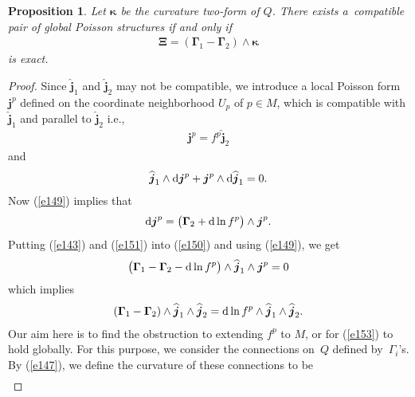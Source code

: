 \documentclass[10pt,a4paper]{amsart}
\numberwithin{equation}{section}
\newtheorem{Proposition}[Theorem]{Proposition}
 { \theoremstyle{definition}
\newtheorem{Definition}[Theorem]{Definition} }
\begin{document}
\begin{Proposition}\label{proposition6}
Let $\boldsymbol{\kappa }$ be the curvature two-form of $Q$. There exists a~compatible pair of global Poisson structures if and only if
\begin{gather*}
\boldsymbol{\Xi }= ( \boldsymbol{\Gamma }_{1}-\boldsymbol{\Gamma }_{2} ) \wedge \boldsymbol{\kappa } \label{e148}
\end{gather*}
is exact.
\end{Proposition}

\begin{proof}
Since $\widehat{\boldsymbol{j}}_{1}$ and $\widehat{\boldsymbol{j}}_{2}$ may not be compatible, we introduce a local Poisson form $\boldsymbol{j}^{p}$ def\/ined on the coordinate neighborhood $U_{p}$ of $p\in M$, which is compatible with $\widehat{\boldsymbol{j}}_{1}$ and parallel to $\widehat{\boldsymbol{j}}_{2}$ i.e.,
\begin{gather}
\boldsymbol{j}^{p}=f^{p}\widehat{\boldsymbol{j}}_{2} \label{e149}
\end{gather}
and
\begin{gather}
\widehat{\boldsymbol{j}}_{1}\wedge {\rm d}\boldsymbol{j}^{p}+\boldsymbol{j}^{p}\wedge {\rm d}\widehat{\boldsymbol{j}}_{1}=0. \label{e150}
\end{gather}
Now (\ref{e149}) implies that
\begin{gather}
{\rm d}\boldsymbol{j}^{p}=\big( \boldsymbol{\Gamma }_{2}+{\rm d}\ln f^{p}\big) \wedge \boldsymbol{j}^{p}. \label{e151}
\end{gather}
Putting (\ref{e143}) and (\ref{e151}) into (\ref{e150}) and using (\ref{e149}), we get
\begin{gather*}
\big( \boldsymbol{\Gamma }_{1}-\boldsymbol{\Gamma }_{2}-{\rm d}\ln f^{p}\big) \wedge \widehat{\boldsymbol{j}}_{1}\wedge \boldsymbol{j}^{p}=0
\end{gather*}
which implies
\begin{gather}
 ( \boldsymbol{\Gamma }_{1}-\boldsymbol{\Gamma }_{2} ) \wedge \widehat{\boldsymbol{j}}_{1}\wedge \widehat{\boldsymbol{j}}_{2}={\rm d}\ln f^{p}\wedge \widehat{\boldsymbol{j}}_{1}\wedge \widehat{\boldsymbol{j}}_{2}. \label{e153}
\end{gather}
Our aim here is to f\/ind the obstruction to extending $f^{p}$ to $M$, or for (\ref{e153}) to hold globally. For this purpose, we consider the connections on~$Q$ def\/ined by~$\Gamma _{i}$'s. By (\ref{e147}), we def\/ine the curvature of these connections to be
\begin{gather*}

\end{gather*}
\end{proof}
\end{document}
